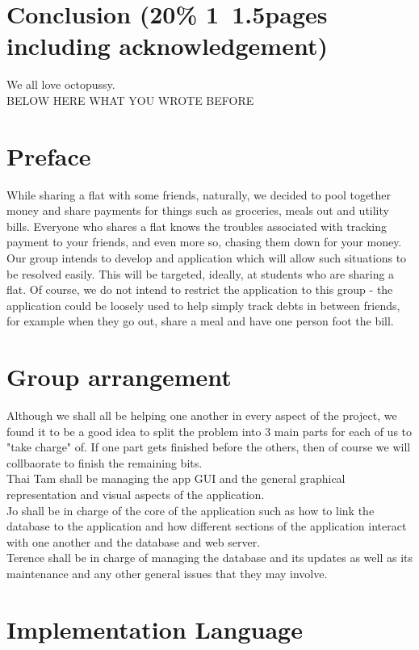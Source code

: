 \documentclass[a4paper,11pt]{article}
\begin{document}
\section*{Conclusion (20\% 1~1.5pages including acknowledgement)}

We all love octopussy.\\


BELOW HERE WHAT YOU WROTE BEFORE\\


\section*{Preface}
While sharing a flat with some friends, naturally, we decided to pool together money and share payments for things such as groceries, meals out and utility bills. Everyone who shares a flat knows the troubles associated with tracking payment to your friends, and even more so, chasing them down for your money. Our group intends to develop and application which will allow such situations to be resolved easily. This will be targeted, ideally, at students who are sharing a flat. Of course, we do not intend to restrict the application to this group - the application could be loosely used to help simply track debts in between friends, for example when they go out, share a meal and have one person foot the bill.

\section*{Group arrangement}
Although we shall all be helping one another in every aspect of the project, we found it to be a good idea to split the problem into 3 main parts for each of us to "take charge" of. If one part gets finished before the others, then of course we will collbaorate to finish the remaining bits.\\ 
Thai Tam shall be managing the app GUI and the general graphical representation and visual aspects of the application.\\
Jo shall be in charge of the core of the application such as how to link the database to the application and how different sections of the application interact with one another and the database and web server.\\
Terence shall be in charge of managing the database and its updates as well as its maintenance and any other general issues that they may involve.

\section*{Implementation Language}
\end{document}
